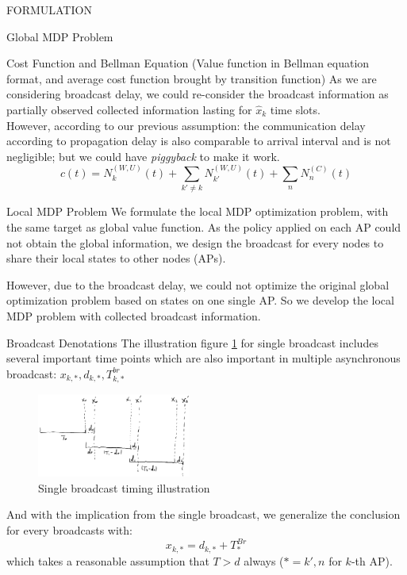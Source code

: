 \documentclass[10pt, conference, letterpaper]{IEEEtran}
\begin{document}
\begin{section}{FORMULATION}
\begin{subsection}{Global MDP Problem}
            \begin{subsubsection}{Cost Function and Bellman Equation}
                (Value function in Bellman equation format, and average cost function brought by transition function)
                As we are considering broadcast delay, we could re-consider the broadcast information as partially observed collected information lasting for $\hat{x}_k$ time slots.
                \\
                However, according to our previous assumption: the communication delay according to propagation delay is also comparable to arrival interval and is not negligible; but we could have \emph{piggyback} to make it work.
                \\
                $$
                c(t) = N_k^{(W,U)}(t) + \sum_{k' \neq k} N_{k'}^{(W,U)}(t) + \sum_{n} N_{n}^{(C)}(t)
                $$
            \end{subsubsection}
        \end{subsection}

        \begin{subsection}{Local MDP Problem}
            We formulate the local MDP optimization problem, with the same target as global value function. As the policy applied on each AP could not obtain the global information, we design the broadcast for every nodes to share their local states to other nodes (APs).
            
            However, due to the broadcast delay, we could not optimize the original global optimization problem based on states on one single AP. So we develop the local MDP problem with collected broadcast information.

            \begin{subsubsection}{Broadcast Denotations}
                The illustration figure \ref{fig:brd} for single broadcast includes several important time points which are also important in multiple asynchronous broadcast: $x_{k,*}, d_{k,*}, T^{br}_{k,*}$
                \begin{figure}[h]
                    \centering
                    \includegraphics[width=0.45\textwidth]{single-broadcast.png}
                    \caption{Single broadcast timing illustration}
                    \label{fig:brd}
                \end{figure}
                And with the implication from the single broadcast, we generalize the conclusion for every broadcasts with:
                $$
                x_{k,*} = d_{k,*} + T^{Br}_{*}
                $$
                which takes a reasonable assumption that $T>d$ always ($*=k',n$ for $k$-th AP).


\end{subsubsection}
\end{subsection}
\end{section}
\end{document}
